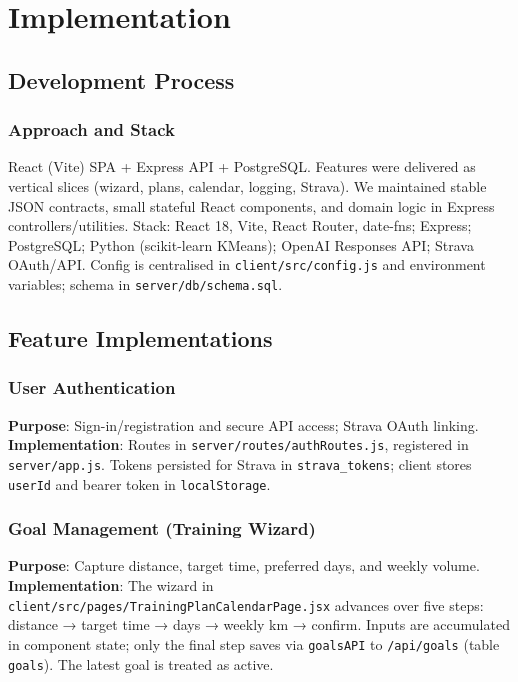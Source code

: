 \chapter{Implementation}

\section{Development Process}
\subsection{Approach and Stack}
React (Vite) SPA + Express API + PostgreSQL. Features were delivered as vertical slices (wizard, plans, calendar, logging, Strava). We maintained stable JSON contracts, small stateful React components, and domain logic in Express controllers/utilities. Stack: React 18, Vite, React Router, date-fns; Express; PostgreSQL; Python (scikit-learn KMeans); OpenAI Responses API; Strava OAuth/API. Config is centralised in \verb|client/src/config.js| and environment variables; schema in \verb|server/db/schema.sql|.

\section{Feature Implementations}
\subsection{User Authentication}
\textbf{Purpose}: Sign-in/registration and secure API access; Strava OAuth linking.
\newline
\textbf{Implementation}: Routes in \verb|server/routes/authRoutes.js|, registered in \verb|server/app.js|. Tokens persisted for Strava in \verb|strava_tokens|; client stores \verb|userId| and bearer token in \verb|localStorage|.

\subsection{Goal Management (Training Wizard)}
\textbf{Purpose}: Capture distance, target time, preferred days, and weekly volume.
\newline
\textbf{Implementation}: The wizard in \verb|client/src/pages/TrainingPlanCalendarPage.jsx| advances over five steps: distance → target time → days → weekly km → confirm. Inputs are accumulated in component state; only the final step saves via \verb|goalsAPI| to \verb|/api/goals| (table \verb|goals|). The latest goal is treated as active.

